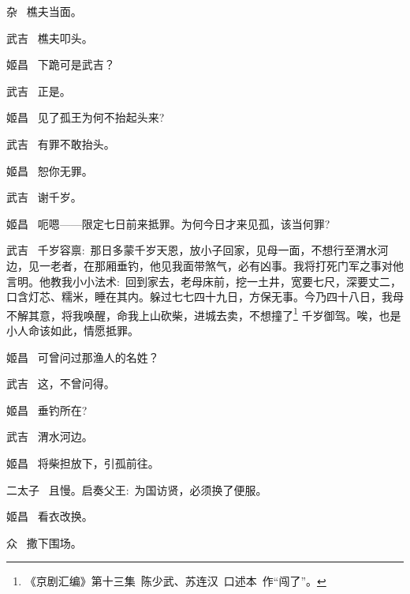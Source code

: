 {杂\hspace{41pt}~ 樵夫当面。

武吉\hspace{30pt}~ 樵夫叩头。

姬昌\hspace{30pt}~ 下跪可是武吉？

武吉\hspace{30pt}~ 正是。

姬昌\hspace{30pt}~ 见了孤王为何不抬起头来?

武吉\hspace{30pt}~ 有罪不敢抬头。

姬昌\hspace{30pt}~ 恕你无罪。

武吉\hspace{30pt}~ 谢千岁。

姬昌\hspace{30pt}~ 呃嗯------限定七日前来抵罪。为何今日才来见孤，该当何罪?

\setlength{\hangindent}{60pt}   %
{武吉\hspace{30pt}~ 千岁容禀:~那日多蒙千岁天恩，放小子回家，见母一面，不想行至渭水河边，见一老者，在那厢垂钓，他见我面带煞气，必有凶事。我将打死门军之事对他言明。他教我小小法术:~回到家去，老母床前，挖一土井，宽要七尺，深要丈二，口含灯芯、糯米，睡在其内。躲过七七四十九日，方保无事。今乃四十八日，我母不解其意，将我唤醒，命我上山砍柴，进城去卖，不想撞了\footnote{《京剧汇编》第十三集~陈少武、苏连汉~口述本~作``闯了''。}%
千岁御驾。唉，也是小人命该如此，情愿抵罪。}

姬昌\hspace{30pt}~ 可曾问过那渔人的名姓？

武吉\hspace{30pt}~ 这，不曾问得。

姬昌\hspace{30pt}~ 垂钓所在?

武吉\hspace{30pt}~ 渭水河边。

姬昌\hspace{30pt}~ 将柴担放下，引孤前往。

{\akai 二}太子\hspace{20pt}~ 且慢。启奏父王:~为国访贤，必须换了便服。

姬昌\hspace{30pt}~ 看衣改换。

众\hspace{41pt}~ 撒下围场。

}
